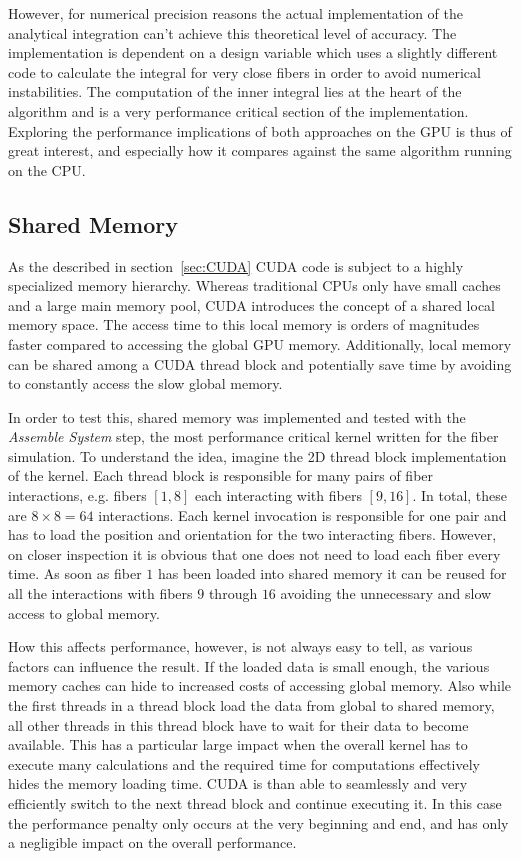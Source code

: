 \documentclass[a4paper,11pt]{kth-mag}
\begin{document}
However, for numerical precision reasons the actual implementation of the analytical integration can't achieve this theoretical level of accuracy. The implementation is dependent on a design variable which uses a slightly different code to calculate the integral for very close fibers in order to avoid numerical instabilities. The computation of the inner integral lies at the heart of the algorithm and is a very performance critical section of the implementation. Exploring the performance implications of both approaches on the GPU is thus of great interest, and especially how it compares against the same algorithm running on the CPU.

\subsection{Shared Memory}

As the described in section~\ref{sec:CUDA} CUDA code is subject to a highly specialized memory hierarchy. Whereas traditional CPUs only have small caches and a large main memory pool, CUDA introduces the concept of a shared local memory space. The access time to this local memory is orders of magnitudes faster compared to accessing the global GPU memory. Additionally, local memory can be shared among a CUDA thread block and potentially save time by avoiding to constantly access the slow global memory.

In order to test this, shared memory was implemented and tested with the \emph{Assemble System} step, the most performance critical kernel written for the fiber simulation. To understand the idea, imagine the 2D thread block implementation of the kernel. Each thread block is responsible for many pairs of fiber interactions, e.g. fibers $[1,8]$ each interacting with fibers $[9,16]$. In total, these are $8 \times 8 = 64$ interactions. Each kernel invocation is responsible for one pair and has to load the position and orientation for the two interacting fibers. However, on closer inspection it is obvious that one does not need to load each fiber every time. As soon as fiber $1$ has been loaded into shared memory it can be reused for all the interactions with fibers $9$ through $16$ avoiding the unnecessary and slow access to global memory.

How this affects performance, however, is not always easy to tell, as various factors can influence the result. If the loaded data is small enough, the various memory caches can hide to increased costs of accessing global memory. Also while the first threads in a thread block load the data from global to shared memory, all other threads in this thread block have to wait for their data to become available. This has a particular large impact when the overall kernel has to execute many calculations and the required time for computations effectively hides the memory loading time. CUDA is than able to seamlessly and very efficiently switch to the next thread block and continue executing it. In this case the performance penalty only occurs at the very beginning and end, and has only a negligible impact on the overall performance.
\end{document}

